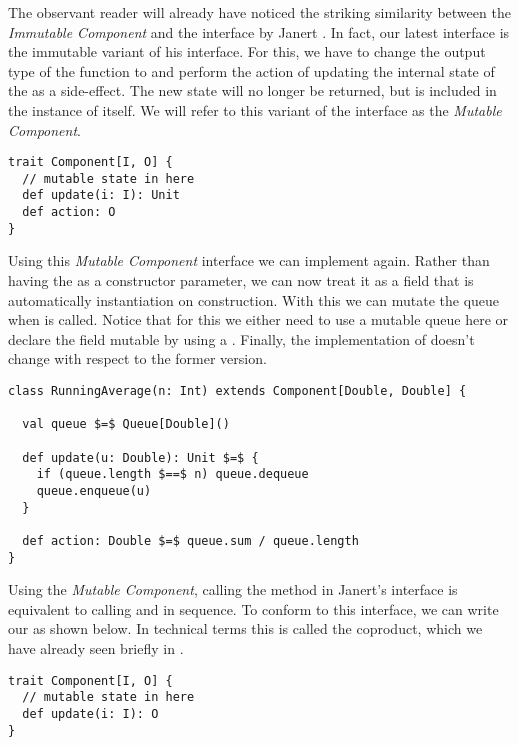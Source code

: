 The observant reader will already have noticed the striking similarity between the \textit{Immutable Component} and the  interface by Janert \cite{janert2013-feedback}. In fact, our latest \comp interface is the immutable variant of his interface. For this, we have to change the output type of the  function to  and perform the action of updating the internal state of the \comp as a side-effect. The new state will no longer be returned, but is included in the instance of \comp itself. We will refer to this variant of the interface as the \textit{Mutable Component}.

\begin{lstlisting}[style=InlineScalaStyle]
trait Component[I, O] {
  // mutable state in here
  def update(i: I): Unit
  def action: O
}
\end{lstlisting}

Using this \textit{Mutable Component} interface we can implement  again. Rather than having the  as a constructor parameter, we can now treat it as a field that is automatically instantiation on construction. With this we can mutate the queue when  is called. Notice that for this we either need to use a mutable queue here or declare the field mutable by using a . Finally, the implementation of  doesn't change with respect to the former version.

\begin{lstlisting}[style=ScalaStyle, caption={Implementation of \code{RunningAverage} using the \textit{Mutable Component} interface}, label={lst:mutable-runningaverage}]
class RunningAverage(n: Int) extends Component[Double, Double] {

  val queue $=$ Queue[Double]()

  def update(u: Double): Unit $=$ {
    if (queue.length $==$ n) queue.dequeue
    queue.enqueue(u)
  }

  def action: Double $=$ queue.sum / queue.length
}
\end{lstlisting}

Using the \textit{Mutable Component}, calling the  method in Janert's \comp interface is equivalent to calling  and  in sequence. To conform to this interface, we can write our \comp as shown below. In technical terms this is called the coproduct, which we have already seen briefly in .

\begin{lstlisting}[style=InlineScalaStyle]
trait Component[I, O] {
  // mutable state in here
  def update(i: I): O
}
\end{lstlisting}

